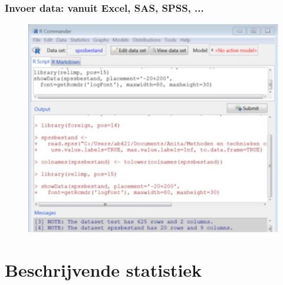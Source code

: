 \documentclass{beamer}
\begin{document}
\begin{frame}
  \frametitle{Invoer data: vanuit Excel, SAS, SPSS, ...}
  \begin{figure}[h]
    \centering
    \includegraphics[width=.9\textwidth]{img/oef3/invoer-uit-spss}
  \end{figure}
\end{frame}







\section{Beschrijvende statistiek}
\end{document}
